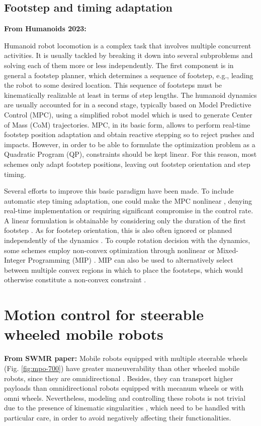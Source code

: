 \subsection{Footstep and timing adaptation}
\textbf{From Humanoids 2023:}

Humanoid robot locomotion is a complex task that involves multiple concurrent activities. It is usually tackled by breaking it down into several subproblems and solving each of them more or less independently. The first component is in general a footstep planner, which determines a sequence of footstep, e.g., leading the robot to some desired location. This sequence of footsteps must be kinematically realizable at least in terms of step lengths. The humanoid dynamics are usually accounted for in a second stage, typically based on Model Predictive Control (MPC), using a simplified robot model which is used to generate Center of Mass (CoM) trajectories. MPC, in its basic form, allows to perform real-time footstep position adaptation \cite{Herdt2010IROS} and obtain reactive stepping so to  reject pushes and impacts. However, in order to be able to formulate the optimization problem as a Quadratic Program (QP), constraints should be kept linear. For this reason, most schemes only adapt footstep positions, leaving out footstep orientation and step timing.

Several efforts to improve this basic paradigm have been made. To include automatic step timing adaptation, one could make the MPC nonlinear \cite{Maximo2020MIQPAutomaticWalking,Bohorquez2017AdaptiveStepDuration,Caron2017Whentomakeastep,Aurelien2014IROS}, denying real-time implementation or requiring significant compromise in the control rate. A linear formulation is obtainable by considering only the duration of the first footstep \cite{Smaldone2021FeasibilityDrivenSTA,Khadiv2020StepTimingAdaptation}. As for footstep orientation, this is also often ignored or planned independently of the dynamics \cite{Herdt2010IROS}. To couple rotation decision with the dynamics, some schemes employ non-convex optimization through nonlinear \cite{Naveau2017RAL,Bohorquez2018AdaptiveStepRotation} or Mixed-Integer Programming (MIP) \cite{Maximo2020MIQPAutomaticWalking}. MIP can also be used to alternatively select between multiple convex regions in which to place the footsteps, which would otherwise constitute a non-convex constraint \cite{Aceituno2018RAL,Deits2014FootstepPlanningMIQCQP}.


\section{Motion control for steerable wheeled mobile robots}
\textbf{From SWMR paper:}
Mobile robots equipped with multiple steerable wheels (Fig. \ref{fig:mpo-700})
have greater maneuverability than other wheeled mobile robots, since they are
omnidirectional \cite{RobuffoGiordano2009ICRA}. Besides, they can transport
higher payloads than omnidirectional robots equipped with mecanum wheels or
with omni wheels. Nevertheless, modeling and controlling these robots is not
trivial due to the presence of kinematic singularities \cite{Sorour2017RAL},
which need to be handled with particular care, in order to avoid negatively
affecting their functionalities.

